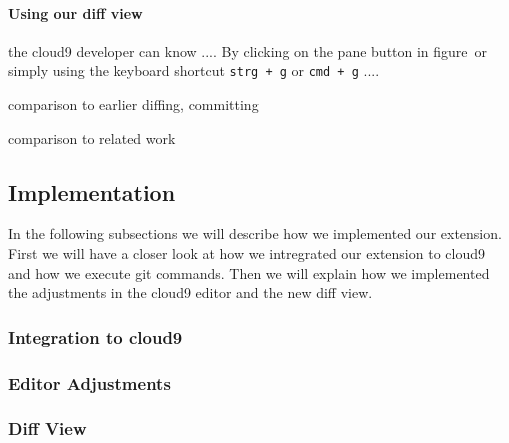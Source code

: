 \paragraph{Using our diff view} the cloud9 developer can know ....
By clicking on the pane button  in figure~\needcite or simply using the keyboard shortcut \texttt{strg + g} or \texttt{cmd + g} ....

comparison to earlier diffing, committing

comparison to related work

\subsection{Implementation}
In the following subsections we will describe how we implemented our extension.
First we will have a closer look at how we intregrated our extension to cloud9 and how we execute git commands.
Then we will explain how we implemented the adjustments in the cloud9 editor and the new diff view.

\subsubsection{Integration to cloud9}

\subsubsection{Editor Adjustments}

\subsubsection{Diff View}
